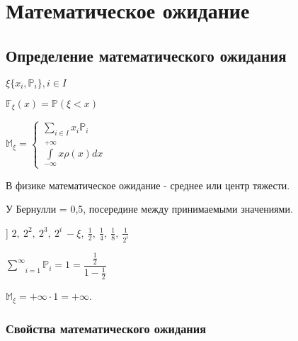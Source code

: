 \documentclass[../Main.tex]{subfiles}
\begin{document}
\chapter{Математическое ожидание}

\section{Определение математического ожидания}

\(\xi \{x_i, \mathbb{P}_i\}, i \in I\)

\(\mathbb{F}_\xi (x)=\mathbb{P}(\xi < x)\)


\(\mathbb{M}_\xi = \begin{cases} \underset{i \in I}{\sum}x_i \mathbb{P}_i \\ \overset{+\infty}{\underset{-\infty}{\int}}x \rho(x) dx \end{cases}\)


В физике математическое ожидание - среднее или центр тяжести.

У Бернулли = 0,5, посередине между принимаемыми значениями.


] \(2,\ 2^2,\ 2^3,\ 2^i\ - \xi,\ \frac{1}{2},\ \frac{1}{4},\ \frac{1}{8},\ \frac{1}{2^i}\)

\(\underset{i=1}{\overset{\infty}{\sum}}\mathbb{P}_i = 1 = \dfrac{\frac{1}{2}}{1-\frac{1}{2}}\)

\(\mathbb{M}_\xi = +\infty \cdot 1= +\infty\).



\subsection{Свойства математического ожидания}
\end{document}
